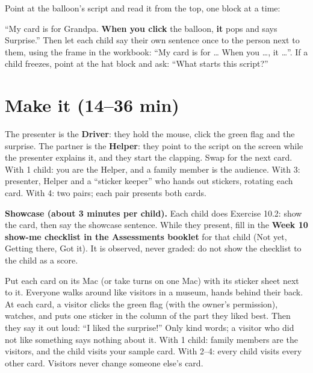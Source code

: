 \begin{workedexample}
Point at the balloon's script and read it from the top, one block at a time:
\begin{center}
\begin{scratch}[scale=0.85]
\end{scratch}
\end{center}
\enquote{My card is for Grandpa. \textbf{When you click} the balloon, \textbf{it} pops and says Surprise.} Then let each child say their own sentence once to the person next to them, using the frame in the workbook: \enquote{My card is for \ldots{} When you \ldots, it \ldots}. If a child freezes, point at the hat block and ask: \enquote{What starts this script?}
\end{workedexample}

\section{Make it (14--36 min)}
\begin{pairroles}
The presenter is the \textbf{Driver}: they hold the mouse, click the green flag and the surprise. The partner is the \textbf{Helper}: they point to the script on the screen while the presenter explains it, and they start the clapping. Swap for the next card. With 1 child: you are the Helper, and a family member is the audience. With 3: presenter, Helper and a \enquote{sticker keeper} who hands out stickers, rotating each card. With 4: two pairs; each pair presents both cards.
\end{pairroles}

\textbf{Showcase (about 3 minutes per child).} Each child does Exercise 10.2: show the card, then say the showcase sentence. While they present, fill in the \textbf{Week 10 show-me checklist in the Assessments booklet} for that child (Not yet, Getting there, Got it). It is observed, never graded: do not show the checklist to the child as a score.

\begin{unplugged}
Put each card on its Mac (or take turns on one Mac) with its sticker sheet next to it. Everyone walks around like visitors in a museum, hands behind their back. At each card, a visitor clicks the green flag (with the owner's permission), watches, and puts one sticker in the column of the part they liked best. Then they say it out loud: \enquote{I liked the surprise!} Only kind words; a visitor who did not like something says nothing about it. With 1 child: family members are the visitors, and the child visits your sample card. With 2--4: every child visits every other card. Visitors never change someone else's card.
\end{unplugged}

